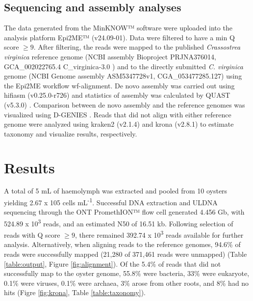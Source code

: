 \documentclass[lineno,referee,pdflatex,sn-basic]{sn-jnl}%
\begin{document}
\subsection{Sequencing and assembly analyses}
The data generated from the MinKNOW™ software were uploaded into the analysis platform Epi2ME™ (v24.09-01). Data were filtered to have a min Q score $\geq 9$. After filtering, the reads were mapped to the published \textit{Crassostrea virginica} reference genome (NCBI assembly Bioproject PRJNA376014, GCA\_002022765.4 C\_virginica-3.0 \cite{gomez-chiarri_developing_2015}) and to the directly submitted \textit{C. virginica} genome (NCBI Genome assembly ASM5347728v1, CGA\_053477285.127) using the Epi2ME workflow wf-alignment. De novo assembly was carried out using hifiasm (v0.25.0-r726) \cite{cheng_haplotype-resolved_2021} and statistics of assembly was calculated by QUAST (v5.3.0) \cite{mikheenko_webquast_2023}. Comparison between de novo assembly and the reference genomes was visualized using D-GENIES \cite{cabanettes_d-genies_2018}. Reads that did not align with either reference genome were analyzed using kraken2 (v2.1.4) \cite{wood_improved_2019} and krona (v2.8.1) \cite{ondov_interactive_2011} to estimate taxonomy and visualize results, respectively.

\section{Results}
A total of 5 mL of haemolymph was extracted and pooled from 10 oysters yielding 2.67 x 105 cells mL\textsuperscript{-1}. Successful DNA extraction and ULDNA sequencing through the ONT PromethION™ flow cell generated 4.456 Gb, with 524.89 x 10\textsuperscript{3} reads, and an estimated N50 of 16.51 kb. Following selection of reads with Q score $\geq 9$, there remained 392.74 x 10\textsuperscript{3} reads available for further analysis. Alternatively, when aligning reads to the reference genomes, 94.6\% of reads were successfully mapped (21,280 of 371,461 reads were unmapped) (Table \ref{table:output}, Figure \ref{fig:alignment}). Of the 5.4\% of reads that did not successfully map to the oyster genome, 55.8\% were bacteria, 33\% were eukaryote, 0.1\% were viruses, 0.1\% were archaea, 3\% arose from other roots, and 8\% had no hits  (Figre \ref{fig:krona}, Table \ref{table:taxonomy}).
\end{document}

